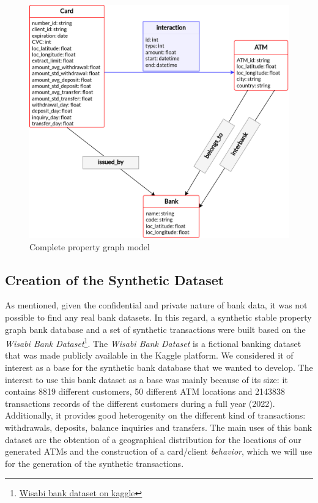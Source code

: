 \begin{figure}[h]
  \centering
  \includegraphics[scale = 0.7]{images/1-DataModel/PG-behavior-complete.png}
  \caption{Complete property graph model}
  \label{img:pg-complete}
\end{figure}

\subsection{Creation of the Synthetic Dataset}

As mentioned, given the confidential and private nature of bank data, it was not possible to find any real bank datasets. In this regard, a synthetic stable property graph bank database and a set of synthetic transactions were built based on the \emph{Wisabi Bank Dataset}\footnote{\href{https://www.kaggle.com/datasets/obinnaiheanachor/wisabi-bank-dataset}{Wisabi bank dataset on kaggle}}. The \emph{Wisabi Bank Dataset} is a fictional banking dataset that was made publicly available in the Kaggle platform. We considered it of interest as a base for the synthetic bank
database that we wanted to develop. The interest to use this bank dataset as a base was mainly because of its size: it contains 8819 different customers, 50 different ATM locations and 2143838 transactions records of the different customers during a full year (2022). Additionally, it provides good heterogenity on the different kind of transactions: withdrawals, deposits, balance inquiries and transfers. The main uses of this bank dataset are the obtention of a geographical distribution for
the locations of our generated ATMs and the construction of a card/client \emph{behavior}, which we will use for the generation of the synthetic transactions.

